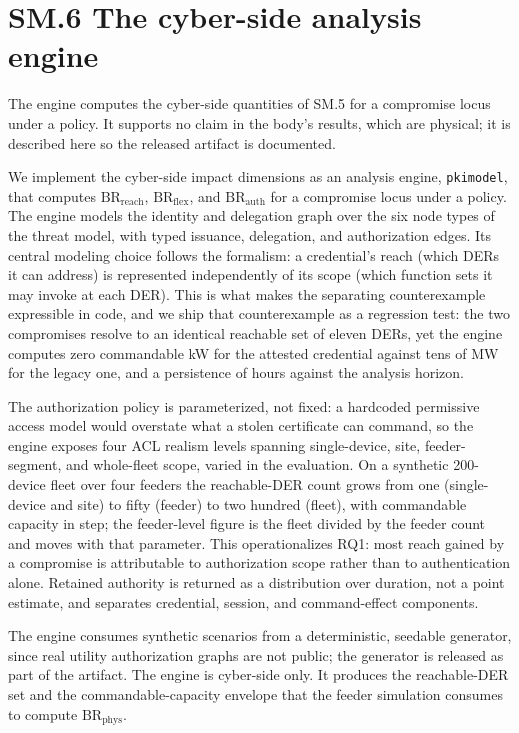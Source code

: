 \documentclass[review]{elsarticle}
\newcommand{\BRreach}{\mathrm{BR}_{\mathrm{reach}}}
\newcommand{\BRflex}{\mathrm{BR}_{\mathrm{flex}}}
\newcommand{\BRauth}{\mathrm{BR}_{\mathrm{auth}}}
\newcommand{\BRphys}{\mathrm{BR}_{\mathrm{phys}}}
\begin{document}
\section*{SM.6 The cyber-side analysis engine}

The engine computes the cyber-side quantities of SM.5 for a compromise locus under a policy. It
supports no claim in the body's results, which are physical; it is described here so the released
artifact is documented.

We implement the cyber-side impact dimensions as an analysis engine, \texttt{pkimodel}, that computes
$\BRreach$, $\BRflex$, and $\BRauth$ for a compromise locus under a policy. The engine models
the identity and delegation graph over the six node types of the threat model, with typed
issuance, delegation, and authorization edges. Its central modeling choice follows the
formalism: a credential's reach (which DERs it can address) is represented independently of
its scope (which function sets it may invoke at each DER). This is what makes the separating
counterexample expressible in code, and we ship that counterexample as a regression test:
the two compromises resolve to an identical reachable set of eleven DERs, yet the engine
computes zero commandable kW for the attested credential against tens of MW for the legacy
one, and a persistence of hours against the analysis horizon.

The authorization policy is parameterized, not fixed: a hardcoded permissive access model would
overstate what a stolen certificate can command, so the engine exposes four ACL realism levels
spanning single-device, site, feeder-segment, and whole-fleet scope, varied in the evaluation. On a
synthetic 200-device fleet over four feeders the reachable-DER count grows from one (single-device
and site) to fifty (feeder) to two hundred (fleet), with commandable capacity in step; the
feeder-level figure is the fleet divided by the feeder count and moves with that parameter. This
operationalizes RQ1: most reach gained by a compromise is attributable to authorization scope
rather than to authentication alone. Retained authority is returned as a distribution over
duration, not a point estimate, and separates credential, session, and command-effect components.

The engine consumes synthetic scenarios from a deterministic, seedable generator, since real
utility authorization graphs are not public; the generator is released as part of the
artifact. The engine is cyber-side only. It produces the reachable-DER set and the
commandable-capacity envelope that the feeder simulation consumes to compute $\BRphys$.



\end{document}
